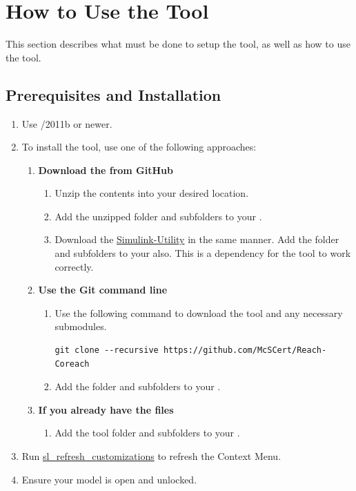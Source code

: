 \documentclass{article}
\begin{document}
\section{How to Use the Tool}
This section describes what must be done to setup the tool, as well as how to use the tool.

\subsection{Prerequisites and Installation}

\begin{enumerate}
	\item Use \Matlab/\Simulink 2011b or newer.
	\item To install the tool, use one of the following approaches:
		\begin{enumerate}
		\item \textbf{Download the  from GitHub}
		\begin{enumerate} 
			\item Unzip the contents into your desired location. 
			\item Add the unzipped folder and subfolders to your \mpath. 
			\item Download the \href{https://github.com/McSCert/Simulink-Utility}{Simulink-Utility} in the same manner. Add the folder and subfolders to your \mpath also. This is a dependency for the tool to work correctly.
		\end{enumerate}
		\item \textbf{Use the Git command line}
			\begin{enumerate}
				\item Use the following command to download the tool and any necessary submodules. 
				\hspace{-5em}\begin{verbatim}git clone --recursive https://github.com/McSCert/Reach-Coreach
				\end{verbatim}
				\item Add the folder and subfolders to your \mpath.
			\end{enumerate}
			\item \textbf{If you already have the files}
			\begin{enumerate}
						\item Add the tool folder and subfolders to your \mpath. 
			\end{enumerate}
	\end{enumerate}
	\item Run \href{https://www.mathworks.com/help/simulink/ug/registering-customizations.html}{sl\_refresh\_customizations} to refresh the Context Menu. 
	\item Ensure your model is open and unlocked.
\end{enumerate}
\end{document}
